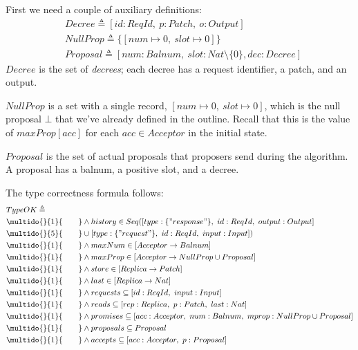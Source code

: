 \documentclass[12pt,a4paper,en]{pracamgr}
\newcommand{\ti}[1]{\textit{#1}}
\newcommand{\ind}[1]{\multido{}{#1}{\qquad}}
\begin{document}
First we need a couple of auxiliary definitions:
\begin{align*}
    & Decree \triangleq [id: ReqId,\ p: Patch,\ o: Output]\\
    & NullProp \triangleq \{[num \mapsto 0,\ slot \mapsto 0]\}\\
    & Proposal \triangleq [num: Balnum,\ slot: Nat \setminus \{0\}, dec: Decree]
\end{align*}
$Decree$ is the set of \ti{decrees}; each decree has a request identifier, a patch, and an output.

$NullProp$ is a set with a single record, $[num \mapsto 0,\ slot \mapsto 0]$, which is the null proposal $\bot$ that we've already defined in the outline. Recall that this is the value of $maxProp[acc]$ for each $acc \in Acceptor$ in the initial state.

$Proposal$ is the set of actual proposals that proposers send during the algorithm. A proposal has a balnum, a positive slot, and a decree.



The type correctness formula follows:
\begin{align*}
    & TypeOK \triangleq\\
    & \ind{1} \land history \in Seq([type: \{"response"\},\ id: ReqId,\ output: Output]\\
    &                               \ind{5} \cup [type: \{"request"\},\ id: ReqId,\ input: Input])\\
    & \ind{1} \land maxNum \in [Acceptor \rightarrow Balnum]\\
    & \ind{1} \land maxProp \in [Acceptor \rightarrow NullProp \cup Proposal]\\
    & \ind{1} \land store \in [Replica \rightarrow Patch]\\
    & \ind{1} \land last \in [Replica \rightarrow Nat]\\
    & \ind{1} \land requests \subseteq [id: ReqId,\ input: Input]\\
    & \ind{1} \land reads \subseteq [rep: Replica,\ p: Patch,\ last: Nat]\\
    & \ind{1} \land promises \subseteq [acc: Acceptor,\ num: Balnum,\ mprop: NullProp \cup Proposal]\\
    & \ind{1} \land proposals \subseteq Proposal\\
    & \ind{1} \land accepts \subseteq [acc: Acceptor,\ p: Proposal]
\end{align*}
\end{document}
